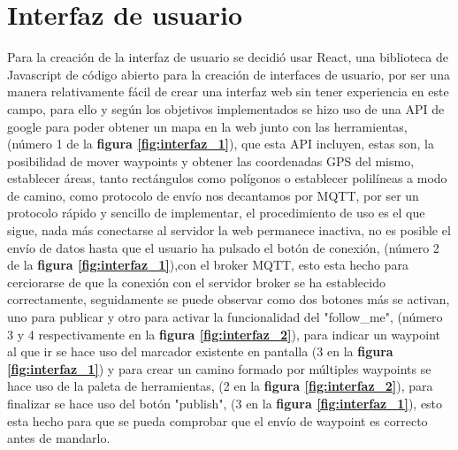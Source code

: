 \section{Interfaz de usuario}

Para la creación de la interfaz de usuario se decidió usar React, una biblioteca de Javascript de código abierto para la creación de 
interfaces de usuario, por ser una manera relativamente fácil de crear una interfaz web sin tener experiencia en este campo, para ello 
y según los objetivos implementados se hizo uso de una API de google para poder obtener un mapa en la web junto con las herramientas, 
(número 1 de la \textbf{figura \ref{fig:interfaz_1}}), que esta API incluyen, estas son, la posibilidad de mover waypoints y obtener 
las coordenadas GPS del mismo, establecer áreas, tanto rectángulos como polígonos o establecer polilíneas a modo de camino, como 
protocolo de envío nos decantamos por MQTT, por ser un protocolo rápido y sencillo de implementar, el procedimiento de uso es el que 
sigue, nada más conectarse al servidor la web permanece inactiva, no es posible el envío de datos hasta que el usuario ha pulsado el 
botón de conexión, (número 2 de la \textbf{figura \ref{fig:interfaz_1}}),con el broker MQTT, esto esta hecho para cerciorarse de que 
la conexión con el servidor broker se ha establecido correctamente, seguidamente se puede observar como dos botones más se activan, 
uno para publicar y otro para activar la funcionalidad del "follow\_me", (número 3 y 4 respectivamente en la 
\textbf{ figura \ref{fig:interfaz_2}}), para indicar un waypoint al que ir se hace uso del marcador existente en pantalla 
(3 en la \textbf{figura \ref{fig:interfaz_1}}) y para crear un camino formado por múltiples waypoints se hace uso de la paleta de 
herramientas, (2 en la \textbf{figura \ref{fig:interfaz_2}}), para finalizar se hace uso del botón "publish", 
(3 en la \textbf{figura \ref{fig:interfaz_1}}), esto esta hecho para que se pueda comprobar que el envío de waypoint es correcto antes 
de mandarlo.

